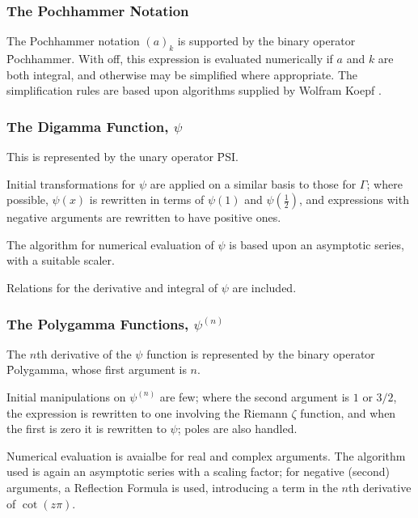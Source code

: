 \subsubsection{The Pochhammer Notation}

The Pochhammer notation $(a)_k$ is supported by the binary operator \f{Pochhammer}.  
With  off, this expression is evaluated
numerically if $a$ and $k$ are both integral, and otherwise may be
simplified where appropriate.  The simplification rules are based upon
algorithms supplied by Wolfram Koepf \cite{Koepf:92}.



\subsubsection{The Digamma Function, $\psi$}

This is represented by the unary operator \f{PSI}.

Initial transformations for $\psi$ are applied on a similar basis to
those for $\Gamma$; where possible, $\psi(x)$ is rewritten in
terms of $\psi(1)$ and $\psi(\frac{1}{2})$, and expressions with negative
arguments are rewritten to have positive ones.

The algorithm for numerical evaluation of $\psi$ is based upon an
asymptotic series, with a suitable scaler.

Relations for the derivative and integral of $\psi$ are included.


\subsubsection{The Polygamma Functions, $\psi^{(n)}$}

The $n$th derivative of the $\psi$ function is represented by the
binary operator \f{Polygamma}, whose first argument is $n$.

Initial manipulations on $\psi^{(n)}$ are few; where the second argument
is $1$ or $3/2$, the expression is rewritten to one involving the
Riemann $\zeta$ function, and when the first is zero it is rewritten to
$\psi$; poles are also handled.

Numerical evaluation is avaialbe for real and complex arguments. The
algorithm used is again an asymptotic series with a scaling factor; for
negative (second) arguments, a Reflection Formula is used, introducing a
term in the $n$th derivative of $\cot(z\pi)$.

